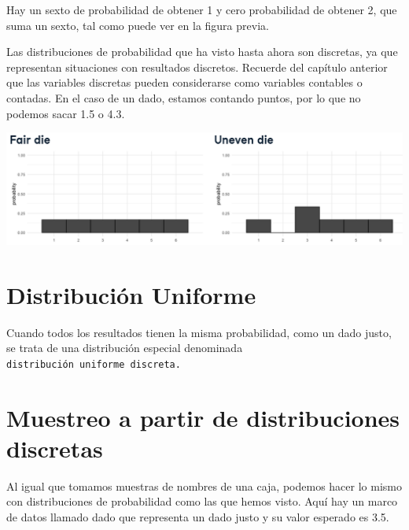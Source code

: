 \documentclass[
  letterpaper,
  DIV=11,
  numbers=noendperiod]{scrreprt}
\newenvironment{Shaded}{\begin{snugshade}}{\end{snugshade}}
\newcommand{\AttributeTok}[1]{\textcolor[rgb]{0.40,0.45,0.13}{#1}}
\newcommand{\DecValTok}[1]{\textcolor[rgb]{0.68,0.00,0.00}{#1}}
\newcommand{\FunctionTok}[1]{\textcolor[rgb]{0.28,0.35,0.67}{#1}}
\newcommand{\NormalTok}[1]{\textcolor[rgb]{0.00,0.23,0.31}{#1}}
\newcommand{\OtherTok}[1]{\textcolor[rgb]{0.00,0.23,0.31}{#1}}
\newcommand{\SpecialCharTok}[1]{\textcolor[rgb]{0.37,0.37,0.37}{#1}}
\begin{document}
Hay un sexto de probabilidad de obtener 1 y cero probabilidad de obtener
2, que suma un sexto, tal como puede ver en la figura previa.

Las distribuciones de probabilidad que ha visto hasta ahora son
discretas, ya que representan situaciones con resultados discretos.
Recuerde del capítulo anterior que las variables discretas pueden
considerarse como variables contables o contadas. En el caso de un dado,
estamos contando puntos, por lo que no podemos sacar 1.5 o 4.3.

\includegraphics{fig26.png}

\hypertarget{distribuciuxf3n-uniforme}{%
\section{Distribución Uniforme}\label{distribuciuxf3n-uniforme}}

Cuando todos los resultados tienen la misma probabilidad, como un dado
justo, se trata de una distribución especial denominada
\texttt{distribución\ uniforme\ discreta.}

\hypertarget{muestreo-a-partir-de-distribuciones-discretas}{%
\section{Muestreo a partir de distribuciones
discretas}\label{muestreo-a-partir-de-distribuciones-discretas}}

Al igual que tomamos muestras de nombres de una caja, podemos hacer lo
mismo con distribuciones de probabilidad como las que hemos visto. Aquí
hay un marco de datos llamado dado que representa un dado justo y su
valor esperado es 3.5.

\begin{Shaded}
\end{Shaded}
\end{document}
